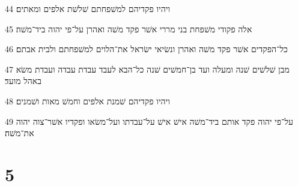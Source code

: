 \par 44 ויהיו פקדיהם למשׁפחתם שׁלשׁת אלפים ומאתים׃
\par 45 אלה פקודי משׁפחת בני מררי אשׁר פקד משׁה ואהרן על־פי יהוה ביד־משׁה׃
\par 46 כל־הפקדים אשׁר פקד משׁה ואהרן ונשׂיאי ישׂראל את־הלוים למשׁפחתם ולבית אבתם׃
\par 47 מבן שׁלשׁים שׁנה ומעלה ועד בן־חמשׁים שׁנה כל־הבא לעבד עבדת עבדה ועבדת משׂא באהל מועד׃
\par 48 ויהיו פקדיהם שׁמנת אלפים וחמשׁ מאות ושׁמנים׃
\par 49 על־פי יהוה פקד אותם ביד־משׁה אישׁ אישׁ על־עבדתו ועל־משׂאו ופקדיו אשׁר־צוה יהוה את־משׁה׃

\chapter{5}

